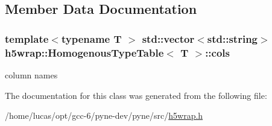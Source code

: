 \subsection{Member Data Documentation}
\subsubsection[{\texorpdfstring{cols}{cols}}]{\setlength{\rightskip}{0pt plus 5cm}template$<$typename T $>$ std\+::vector$<$std\+::string$>$ {\bf h5wrap\+::\+Homogenous\+Type\+Table}$<$ T $>$\+::cols}\hypertarget{classh5wrap_1_1_homogenous_type_table_a8b60fa54475f44bea26caab0137d8507}{}\label{classh5wrap_1_1_homogenous_type_table_a8b60fa54475f44bea26caab0137d8507}
column names 

The documentation for this class was generated from the following file\+:\begin{DoxyCompactItemize}
\item 
/home/lucas/opt/gcc-\/6/pyne-\/dev/pyne/src/\hyperlink{h5wrap_8h}{h5wrap.\+h}\end{DoxyCompactItemize}
